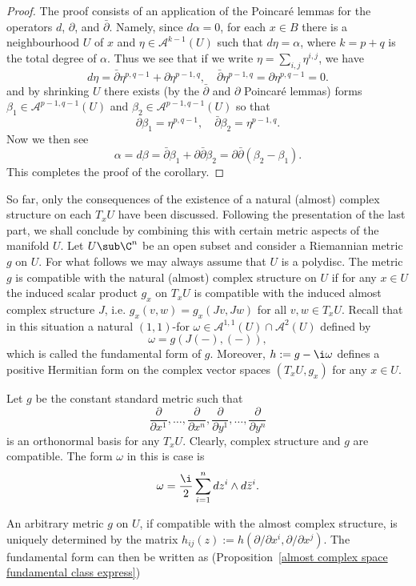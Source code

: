 \begin{proof}
The proof consists of an application of the Poincar\'e lemmas for the operators $d$, $\partial$, and $\bar{\partial}$. Namely, since $d\alpha=0$, for each $x\in B$ there is a neighbourhood $U$ of $x$ and $\eta\in\mathcal{A}^{k-1}(U)$ such that $d\eta=\alpha$, where $k=p+q$ is the total degree of $\alpha$. Thus we see that if we write $\eta=\sum_{i,j}\eta^{i,j}$, we have
\[d\eta=\bar{\partial}\eta^{p,q-1}+\partial\eta^{p-1,q},\quad \bar{\partial}\eta^{p-1,q}=\partial\eta^{p,q-1}=0.\]
and by shrinking $U$ there exists (by the $\bar{\partial}$ and $\partial$ Poincar\'e lemmas) forms $\beta_1\in\mathcal{A}^{p-1,q-1}(U)$ and $\beta_2\in\mathcal{A}^{p-1,q-1}(U)$ so that
\[\partial\beta_1=\eta^{p,q-1},\quad \bar{\partial}\beta_2=\eta^{p-1,q}.\]
Now we then see
\[\alpha=d\beta=\bar{\partial}\beta_1+\partial\bar{\partial}\beta_2=\partial\bar{\partial}(\beta_2-\beta_1).\]
This completes the proof of the corollary.
\end{proof}
So far, only the consequences of the existence of a natural (almost) complex structure on each $T_xU$ have been discussed. Following the presentation of the last part, we shall conclude by combining this with certain metric aspects of the manifold $U$. Let $U\sub\C^n$ be an open subset and consider a Riemannian metric $g$ on $U$. For what follows we may always assume that $U$ is a polydisc. The metric $g$ is compatible with the natural (almost) complex structure on $U$ if for any $x\in U$ the induced scalar product $g_x$ on $T_xU$ is compatible with the induced almost complex structure $J$, i.e. $g_x(v,w)=g_x(Jv,Jw)$ for all $v,w\in T_xU$. Recall that in this situation a natural $(1,1)$-for $\omega\in\mathcal{A}^{1,1}(U)\cap\mathcal{A}^2(U)$ defined by
\[\omega=g(J(-),(-)),\]
which is called the fundamental form of $g$. Moreover, $h:=g-\i\omega$ defines a positive Hermitian form on the complex vector spaces $(T_xU,g_x)$ for any $x\in U$.
\begin{example}
Let $g$ be the constant standard metric such that
\[\frac{\partial}{\partial x^1},\dots,\frac{\partial}{\partial x^n},\frac{\partial}{\partial y^1},\dots,\frac{\partial}{\partial y^n}\]
is an orthonormal basis for any $T_xU$. Clearly, complex structure and $g$ are compatible. The form $\omega$ in this is case is
\[\omega=\frac{\i}{2}\sum_{i=1}^{n}dz^i\wedge d\bar{z}^i.\]
\end{example}
An arbitrary metric $g$ on $U$, if compatible with the almost complex structure, is uniquely determined by the matrix $h_{ij}(z):=h(\partial/\partial x^i,\partial/\partial x^j)$. The fundamental form can then be written as (Proposition~\ref{almost complex space fundamental class express})
